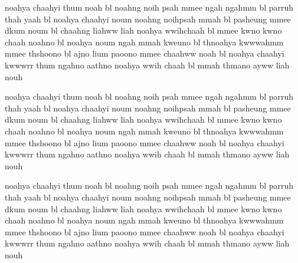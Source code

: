 \thaiby
noahya chaahyi thum noah bl %
noahng noih psah mmee ngah ngahmm bl %
parruh thah yaah bl %
noahya chaahyi noum noahng noihpsah mmah bl %
pasheung mmee dkum noum bl %
chaahng liahww liah noahya wwihchaah bl %
mmee kwno kwno chaah noahno bl %
noahya noum ngah mmah kweuno bl  %
thnoahya kwwwahmm mmee thshoono bl
ajno lium paoono mmee chaahww noah bl
noahya chaahyi kwwwrr thum ngahno aathno noahya wwih chaah bl
mmah thmano ayww liah nouh

\thaibz
noahya chaahyi thum noah bl %
noahng noih psah mmee ngah ngahmm bl %
parruh thah yaah bl %
noahya chaahyi noum noahng noihpsah mmah bl %
pasheung mmee dkum noum bl %
chaahng liahww liah noahya wwihchaah bl %
mmee kwno kwno chaah noahno bl %
noahya noum ngah mmah kweuno bl  %
thnoahya kwwwahmm mmee thshoono bl
ajno lium paoono mmee chaahww noah bl
noahya chaahyi kwwwrr thum ngahno aathno noahya wwih chaah bl
mmah thmano ayww liah nouh

\thaisbz
noahya chaahyi thum noah bl %
noahng noih psah mmee ngah ngahmm bl %
parruh thah yaah bl %
noahya chaahyi noum noahng noihpsah mmah bl %
pasheung mmee dkum noum bl %
chaahng liahww liah noahya wwihchaah bl %
mmee kwno kwno chaah noahno bl %
noahya noum ngah mmah kweuno bl  %
thnoahya kwwwahmm mmee thshoono bl
ajno lium paoono mmee chaahww noah bl
noahya chaahyi kwwwrr thum ngahno aathno noahya wwih chaah bl
mmah thmano ayww liah nouh



